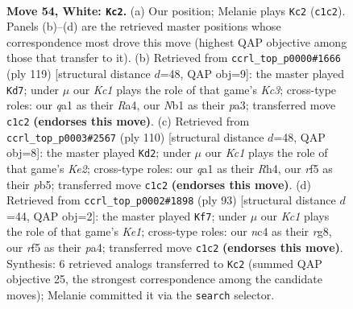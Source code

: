 \documentclass[11pt]{article}
\begin{document}
\clearpage

\begin{figure}[p]\centering
\begin{subfigure}{0.46\textwidth}\centering
\resizebox{\linewidth}{!}{%
\newchessgame
\chessboard[
  setfen={8/2k4p/8/p4r2/2np4/1R6/4P3/qNK5 w - - 2 54},
  showmover=false,
  pgfstyle=straightmove, color=movearrow, markmove={c1-c2}
]}
\caption{}
\end{subfigure}\hfill
\begin{subfigure}{0.46\textwidth}\centering
\resizebox{\linewidth}{!}{%
\newchessgame
\chessboard[
  setfen={8/8/2k5/3n4/r3p3/P5R1/1BPK4/8 b - - 1 60},
  showmover=false,
  pgfstyle=straightmove, color=movearrow, markmove={c6-d7}
]}
\caption{}
\end{subfigure}
\\[4pt]
\begin{subfigure}{0.46\textwidth}\centering
\resizebox{\linewidth}{!}{%
\newchessgame
\chessboard[
  setfen={8/4k3/1p2p3/1pr4p/7R/P3N3/4K3/8 w - - 36 56},
  showmover=false,
  pgfstyle=straightmove, color=movearrow, markmove={e2-d2}
]}
\caption{}
\end{subfigure}\hfill
\begin{subfigure}{0.46\textwidth}\centering
\resizebox{\linewidth}{!}{%
\newchessgame
\chessboard[
  setfen={4k1R1/8/p3n3/8/P7/4r1P1/1P5P/1K6 b - - 2 47},
  showmover=false,
  pgfstyle=straightmove, color=movearrow, markmove={e8-f7}
]}
\caption{}
\end{subfigure}
\caption{\textbf{Move 54, White: \texttt{Kc2}.} (a) Our position; Melanie plays \texttt{Kc2} (\texttt{c1c2}). Panels (b)--(d) are the retrieved master positions whose correspondence most drove this move (highest QAP objective among those that transfer to it). (b) Retrieved from \texttt{ccrl\_top\_p0000\#1666} (ply 119) [structural distance $d$=48, QAP obj=9]: the master played \texttt{Kd7}; under $\mu$ our \emph{Kc1} plays the role of that game's \emph{Kc3}; cross-type roles: our \emph{q}a1 as their \emph{R}a4, our \emph{N}b1 as their \emph{p}a3; transferred move \texttt{c1c2} \textbf{(endorses this move)}. (c) Retrieved from \texttt{ccrl\_top\_p0003\#2567} (ply 110) [structural distance $d$=48, QAP obj=8]: the master played \texttt{Kd2}; under $\mu$ our \emph{Kc1} plays the role of that game's \emph{Ke2}; cross-type roles: our \emph{q}a1 as their \emph{R}h4, our \emph{r}f5 as their \emph{p}b5; transferred move \texttt{c1c2} \textbf{(endorses this move)}. (d) Retrieved from \texttt{ccrl\_top\_p0002\#1898} (ply 93) [structural distance $d$=44, QAP obj=2]: the master played \texttt{Kf7}; under $\mu$ our \emph{Kc1} plays the role of that game's \emph{Ke1}; cross-type roles: our \emph{n}c4 as their \emph{r}g8, our \emph{r}f5 as their \emph{p}a4; transferred move \texttt{c1c2} \textbf{(endorses this move)}. Synthesis: 6 retrieved analogs transferred to \texttt{Kc2} (summed QAP objective 25, the strongest correspondence among the candidate moves); Melanie committed it via the \texttt{search} selector.}
\label{fig:thought-m106}
\end{figure}
\end{document}
